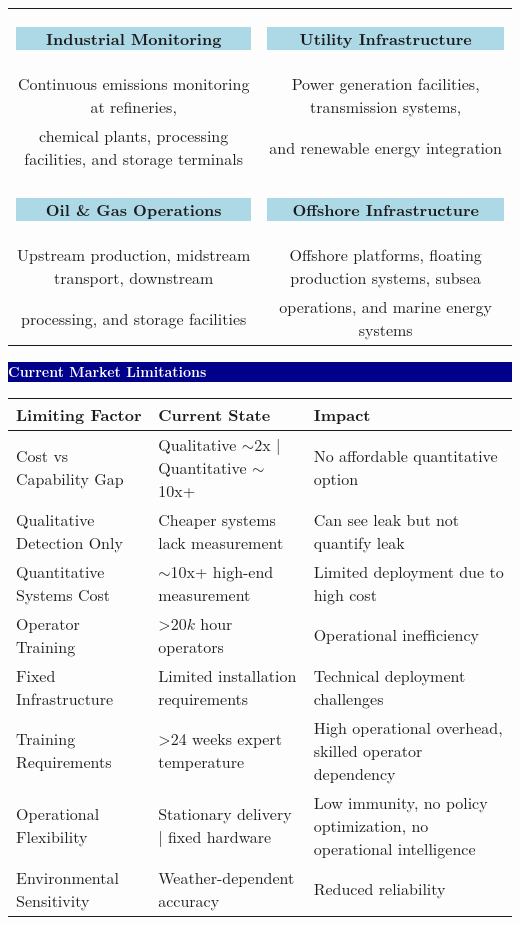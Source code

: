 \documentclass[11pt,a4paper]{article}
\begin{document}
\begin{minipage}{0.48\textwidth}
\begin{center}
\begin{tabular}{cc}
\colorbox{lightblue}{\parbox{2cm}{\centering\textbf{Industrial Monitoring}}} & 
\colorbox{lightblue}{\parbox{2cm}{\centering\textbf{Utility Infrastructure}}} \\
\small Continuous emissions monitoring at refineries, & \small Power generation facilities, transmission systems, \\
\small chemical plants, processing facilities, and storage terminals & \small and renewable energy integration \\
\\
\colorbox{lightblue}{\parbox{2cm}{\centering\textbf{Oil \& Gas Operations}}} & 
\colorbox{lightblue}{\parbox{2cm}{\centering\textbf{Offshore Infrastructure}}} \\
\small Upstream production, midstream transport, downstream & \small Offshore platforms, floating production systems, subsea \\
\small processing, and storage facilities & \small operations, and marine energy systems \\
\end{tabular}
\end{center}

\vspace{0.3cm}

\colorbox{darkblue}{\parbox{\linewidth}{\centering\textcolor{white}{\textbf{Current Market Limitations}}}}

\begin{tabular}{|p{3cm}|p{2cm}|p{3cm}|}
\hline
\textbf{Limiting Factor} & \textbf{Current State} & \textbf{Impact} \\
\hline
Cost vs Capability Gap & Qualitative $\sim$2x | Quantitative $\sim$10x+ & No affordable quantitative option \\
\hline
Qualitative Detection Only & Cheaper systems lack measurement & Can see leak but not quantify leak \\
\hline
Quantitative Systems Cost & $\sim$10x+ high-end measurement & Limited deployment due to high cost \\
\hline
Operator Training & >$20k$ hour operators & Operational inefficiency \\
\hline
Fixed Infrastructure & Limited installation requirements & Technical deployment challenges \\
\hline
Training Requirements & >24 weeks expert temperature & High operational overhead, skilled operator dependency \\
\hline
Operational Flexibility & Stationary delivery | fixed hardware & Low immunity, no policy optimization, no operational intelligence \\
\hline
Environmental Sensitivity & Weather-dependent accuracy & Reduced reliability \\
\hline
\end{tabular}

\end{minipage}
\end{document}
